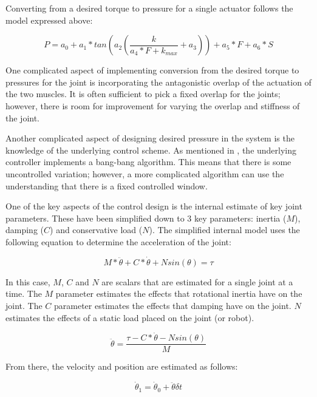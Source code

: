 Converting from a desired torque to pressure for a single actuator follows
the model expressed above:

\begin{equation}
P = a_{0} + a_{1} * tan \left(a_{2} \left(\dfrac{k}{a_{4} * F + k_{max}} + a_{3} \right) \right) + a_{5} * F + a_{6} * S
\end{equation}

One complicated aspect of implementing conversion from the desired torque to 
pressures for
the joint is incorporating the antagonistic overlap of the actuation of the two 
muscles. It is often sufficient to pick a fixed overlap for the joints; however,
there is room for improvement for varying the overlap and stiffness of the joint.

Another complicated aspect of designing desired pressure in the system is the
knowledge of the underlying control scheme. As mentioned in \cite{HuntPMuscles},
the underlying controller implements a bang-bang algorithm. This means that 
there is some uncontrolled variation; however, a more complicated algorithm
can use the understanding that there is a fixed controlled window.


One of the key aspects of the control design is the internal estimate of key 
joint parameters. These have been simplified down to 3 key parameters: inertia 
($M$), damping ($C$) and conservative load ($N$). The simplified internal 
model uses the following equation to determine the acceleration of the joint:

\begin{equation}
M * \ddot{\theta} + C * \dot{\theta} + N sin \left(\theta \right) = \tau
\end{equation}

In this case, $M$, $C$ and $N$ are scalars that are estimated for a single joint at a time. The $M$ parameter estimates the effects that rotational inertia have on the joint. The $C$ parameter estimates the effects that damping have on the joint. $N$ estimates the effects of a static load placed on the joint (or robot).

\begin{equation} \label{eq:accel}
\ddot{\theta} = \dfrac{\tau - C * \dot{\theta} - N sin \left(\theta \right)}{M}
\end{equation}

From there, the velocity and position are estimated as follows:

\begin{equation}
\dot{\theta}_{1} = \dot{\theta}_{0} + \ddot{\theta} \delta t
\end{equation}

